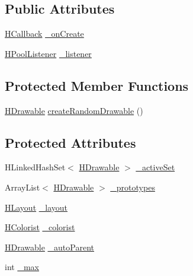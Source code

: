 \subsection*{Public Attributes}
\begin{DoxyCompactItemize}
\item 
\hyperlink{interfacehype_1_1interfaces_1_1_h_callback}{H\-Callback} \hyperlink{classhype_1_1util_1_1_h_drawable_pool_acd09bbc8813c3fab35dd5495ba443873}{\-\_\-on\-Create}
\item 
\hyperlink{interfacehype_1_1interfaces_1_1_h_pool_listener}{H\-Pool\-Listener} \hyperlink{classhype_1_1util_1_1_h_drawable_pool_af89c46b9354c43572322ecfef05be36d}{\-\_\-listener}
\end{DoxyCompactItemize}
\subsection*{Protected Member Functions}
\begin{DoxyCompactItemize}
\item 
\hyperlink{classhype_1_1drawable_1_1_h_drawable}{H\-Drawable} \hyperlink{classhype_1_1util_1_1_h_drawable_pool_a7ffe28f86dea669b090082941cfb9a7d}{create\-Random\-Drawable} ()
\end{DoxyCompactItemize}
\subsection*{Protected Attributes}
\begin{DoxyCompactItemize}
\item 
H\-Linked\-Hash\-Set$<$ \hyperlink{classhype_1_1drawable_1_1_h_drawable}{H\-Drawable} $>$ \hyperlink{classhype_1_1util_1_1_h_drawable_pool_a4424f26db4515c01f37ff844b106656a}{\-\_\-active\-Set}
\item 
Array\-List$<$ \hyperlink{classhype_1_1drawable_1_1_h_drawable}{H\-Drawable} $>$ \hyperlink{classhype_1_1util_1_1_h_drawable_pool_a7146e4d423fde5a2a163c7d2840790bc}{\-\_\-prototypes}
\item 
\hyperlink{interfacehype_1_1layout_1_1_h_layout}{H\-Layout} \hyperlink{classhype_1_1util_1_1_h_drawable_pool_a97dc79fcad128a6fbebfebbe03098e59}{\-\_\-layout}
\item 
\hyperlink{interfacehype_1_1colorist_1_1_h_colorist}{H\-Colorist} \hyperlink{classhype_1_1util_1_1_h_drawable_pool_a43ec5c3cdb73cb7f19f67c71d714fae7}{\-\_\-colorist}
\item 
\hyperlink{classhype_1_1drawable_1_1_h_drawable}{H\-Drawable} \hyperlink{classhype_1_1util_1_1_h_drawable_pool_ae4641976db634b01d779855c7781fcfe}{\-\_\-auto\-Parent}
\item 
int \hyperlink{classhype_1_1util_1_1_h_drawable_pool_affe9b7ec7bb037a7a6dc94a03e0d0d34}{\-\_\-max}
\end{DoxyCompactItemize}



